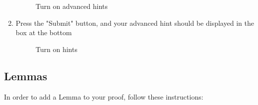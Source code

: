 \begin{enumerate}
	\begin{figure}[!ht]
		\centering
		\caption{Turn on advanced hints}
	\end{figure}
	
	\item Press the "Submit" button, and your advanced hint should be displayed in the box at the bottom
	
	\begin{figure}[!ht]
		\centering
		\caption{Turn on hints}
	\end{figure}
	
\end{enumerate}


\subsection{Lemmas}

In order to add a Lemma to your proof, follow these instructions:

